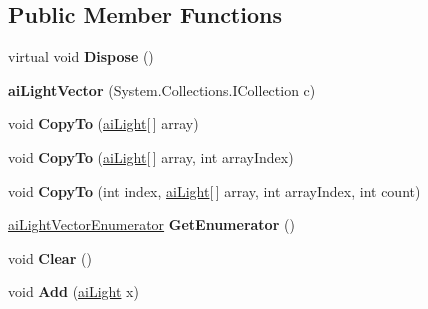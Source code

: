 \subsection*{Public Member Functions}
\begin{DoxyCompactItemize}
\item 
\hypertarget{classai_light_vector_a1c76bc70a4f7016fe454590321937519}{virtual void {\bfseries Dispose} ()}\label{classai_light_vector_a1c76bc70a4f7016fe454590321937519}

\item 
\hypertarget{classai_light_vector_abc711657443d7768e93c0ab5fa060c7d}{{\bfseries ai\+Light\+Vector} (System.\+Collections.\+I\+Collection c)}\label{classai_light_vector_abc711657443d7768e93c0ab5fa060c7d}

\item 
\hypertarget{classai_light_vector_ac10c97d3d1a79aa323869fdfe10a5f84}{void {\bfseries Copy\+To} (\hyperlink{structai_light}{ai\+Light}\mbox{[}$\,$\mbox{]} array)}\label{classai_light_vector_ac10c97d3d1a79aa323869fdfe10a5f84}

\item 
\hypertarget{classai_light_vector_a4649590633ce55704f55e3841256984c}{void {\bfseries Copy\+To} (\hyperlink{structai_light}{ai\+Light}\mbox{[}$\,$\mbox{]} array, int array\+Index)}\label{classai_light_vector_a4649590633ce55704f55e3841256984c}

\item 
\hypertarget{classai_light_vector_a1c587de1f54bc5e45446c3e2ebd0e601}{void {\bfseries Copy\+To} (int index, \hyperlink{structai_light}{ai\+Light}\mbox{[}$\,$\mbox{]} array, int array\+Index, int count)}\label{classai_light_vector_a1c587de1f54bc5e45446c3e2ebd0e601}

\item 
\hypertarget{classai_light_vector_a39e7d31df58fba203c38af21e534fbd7}{\hyperlink{classai_light_vector_1_1ai_light_vector_enumerator}{ai\+Light\+Vector\+Enumerator} {\bfseries Get\+Enumerator} ()}\label{classai_light_vector_a39e7d31df58fba203c38af21e534fbd7}

\item 
\hypertarget{classai_light_vector_aa6d61058dbcf6dd6777d8d665d3215ba}{void {\bfseries Clear} ()}\label{classai_light_vector_aa6d61058dbcf6dd6777d8d665d3215ba}

\item 
\hypertarget{classai_light_vector_af0b1212e5dfed273eaada8df8bf94c51}{void {\bfseries Add} (\hyperlink{structai_light}{ai\+Light} x)}\label{classai_light_vector_af0b1212e5dfed273eaada8df8bf94c51}


\end{DoxyCompactItemize}
